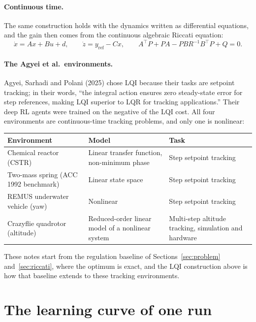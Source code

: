 \documentclass[11pt]{article}
\begin{document}
\paragraph{Continuous time.} The same construction holds with the dynamics written as differential
equations, and the gain then comes from the continuous algebraic Riccati equation:
\[
  \dot x = A x + B u + d, \qquad \dot z = y_{\mathrm{ref}} - C x, \qquad
  A^\top P + P A - P B R^{-1} B^\top P + Q = 0 .
\]

\paragraph{The Agyei et al.\ environments.} Agyei, Sarhadi and Polani (2025) chose LQI because their
tasks are setpoint tracking; in their words, ``the integral action ensures zero steady-state error for
step references, making LQI superior to LQR for tracking applications.'' Their deep RL agents were
trained on the negative of the LQI cost. All four environments are continuous-time tracking
problems, and only one is nonlinear:

\begin{center}
  \begin{tabular}{p{} p{} p{}}
    \toprule
    Environment & Model & Task \\
    \midrule
    Chemical reactor (CSTR) & Linear transfer function, non-minimum phase & Step setpoint tracking \\
    Two-mass spring (ACC 1992 benchmark) & Linear state space & Step setpoint tracking \\
    REMUS underwater vehicle (yaw) & Nonlinear & Step setpoint tracking \\
    Crazyflie quadrotor (altitude) & Reduced-order linear model of a nonlinear system
      & Multi-step altitude tracking, simulation and hardware \\
    \bottomrule
  \end{tabular}
\end{center}

These notes start from the regulation baseline of Sections~\ref{sec:problem} and~\ref{sec:riccati},
where the optimum is exact, and the LQI construction above is how that baseline extends to these
tracking environments.

\section{The learning curve of one run}
\label{sec:onerun}
\end{document}
